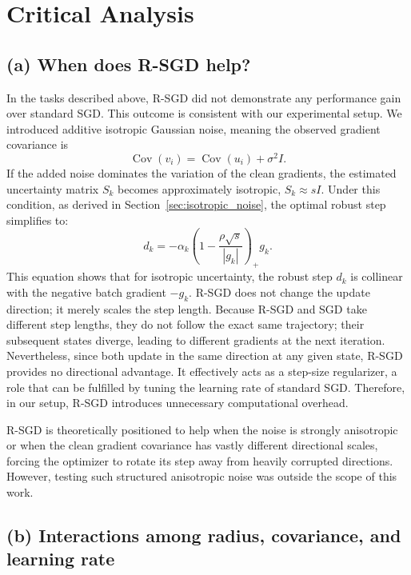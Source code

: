 \section{Critical Analysis}
\label{sec:critical_analysis}

\subsection*{(a) When does R-SGD help?}

In the tasks described above, R-SGD did not demonstrate any performance gain 
over standard SGD. This outcome is consistent with our experimental setup. 
We introduced additive isotropic Gaussian noise, meaning the observed gradient 
covariance is
\begin{equation}
    \operatorname{Cov}(v_i) = \operatorname{Cov}(u_i) + \sigma^2 I .
\end{equation}
If the added noise dominates the variation of the clean gradients, the estimated 
uncertainty matrix $S_k$ becomes approximately isotropic, $S_k \approx s I$. Under 
this condition, as derived in Section~\ref{sec:isotropic_noise}, the optimal robust 
step simplifies to:
\begin{equation}
    d_k = -\alpha_k \left( 1 - \frac{\rho \sqrt{s}}{|g_k|} \right)_+ g_k .
    \label{eq:robust_step_isotropic}
\end{equation}
This equation shows that for isotropic uncertainty, the robust step $d_k$ is collinear with the negative batch gradient $-g_k$. R-SGD does not change the update direction; it merely scales the step length. Because R-SGD and SGD take different step lengths, they do not follow the exact same trajectory; their subsequent states diverge, leading to different gradients at the next iteration. Nevertheless, since both update in the same direction at any given state, R-SGD provides no directional advantage. It effectively acts as a step-size regularizer, a role that can be fulfilled by tuning the learning rate of standard SGD. Therefore, in our setup, R-SGD introduces unnecessary computational overhead.

R-SGD is theoretically positioned to help when the noise is strongly anisotropic or when the clean gradient covariance has vastly different directional scales, forcing the optimizer to rotate its step away from heavily corrupted directions. However, testing such structured anisotropic noise was outside the scope of this work.

\subsection*{(b) Interactions among radius, covariance, and learning rate}

